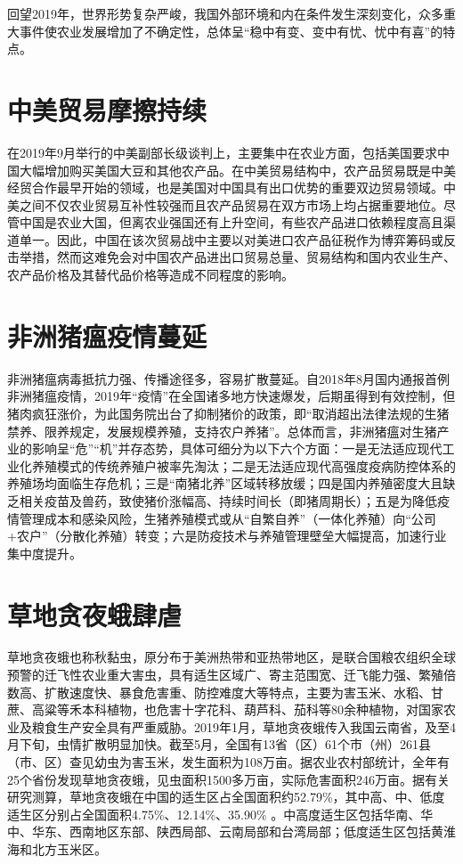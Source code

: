 \documentclass{progbookcn}
\begin{document}
回望2019年，世界形势复杂严峻，我国外部环境和内在条件发生深刻变化，众多重大事件使农业发展增加了不确定性，总体呈“稳中有变、变中有忧、忧中有喜”的特点。

\section{中美贸易摩擦持续}
在2019年9月举行的中美副部长级谈判上，主要集中在农业方面，包括美国要求中国大幅增加购买美国大豆和其他农产品。在中美贸易结构中，农产品贸易既是中美经贸合作最早开始的领域，也是美国对中国具有出口优势的重要双边贸易领域。中美之间不仅农业贸易互补性较强而且农产品贸易在双方市场上均占据重要地位。尽管中国是农业大国，但离农业强国还有上升空间，有些农产品进口依赖程度高且渠道单一。因此，中国在该次贸易战中主要以对美进口农产品征税作为博弈筹码或反击举措，然而这难免会对中国农产品进出口贸易总量、贸易结构和国内农业生产、农产品价格及其替代品价格等造成不同程度的影响。

\section{非洲猪瘟疫情蔓延}
非洲猪瘟病毒抵抗力强、传播途径多，容易扩散蔓延。自2018年8月国内通报首例非洲猪瘟疫情，2019年“疫情”在全国诸多地方快速爆发，后期虽得到有效控制，但猪肉疯狂涨价，为此国务院出台了抑制猪价的政策，即“取消超出法律法规的生猪禁养、限养规定，发展规模养殖，支持农户养猪”。总体而言，非洲猪瘟对生猪产业的影响呈“危”“机”并存态势，具体可细分为以下六个方面：一是无法适应现代工业化养殖模式的传统养殖户被率先淘汰；二是无法适应现代高强度疫病防控体系的养殖场均面临生存危机；三是“南猪北养”区域转移放缓；四是国内养殖密度大且缺乏相关疫苗及兽药，致使猪价涨幅高、持续时间长（即猪周期长）；五是为降低疫情管理成本和感染风险，生猪养殖模式或从“自繁自养”（一体化养殖）向“公司+农户”（分散化养殖）转变；六是防疫技术与养殖管理壁垒大幅提高，加速行业集中度提升。

\section{草地贪夜蛾肆虐}
草地贪夜蛾也称秋黏虫，原分布于美洲热带和亚热带地区，是联合国粮农组织全球预警的迁飞性农业重大害虫，具有适生区域广、寄主范围宽、迁飞能力强、繁殖倍数高、扩散速度快、暴食危害重、防控难度大等特点，主要为害玉米、水稻、甘蔗、高粱等禾本科植物，也危害十字花科、葫芦科、茄科等80余种植物，对国家农业及粮食生产安全具有严重威胁。2019年1月，草地贪夜蛾传入我国云南省，及至4月下旬，虫情扩散明显加快。截至5月，全国有13省（区）61个市（州）261县（市、区）查见幼虫为害玉米，发生面积为108万亩。据农业农村部统计，全年有25个省份发现草地贪夜蛾，见虫面积1500多万亩，实际危害面积246万亩。据有关研究测算，草地贪夜蛾在中国的适生区占全国面积约52.79\%，其中高、中、低度适生区分别占全国面积4.75\%、12.14\%、35.90\% 。中高度适生区包括华南、华中、华东、西南地区东部、陕西局部、云南局部和台湾局部；低度适生区包括黄淮海和北方玉米区。
\end{document}
